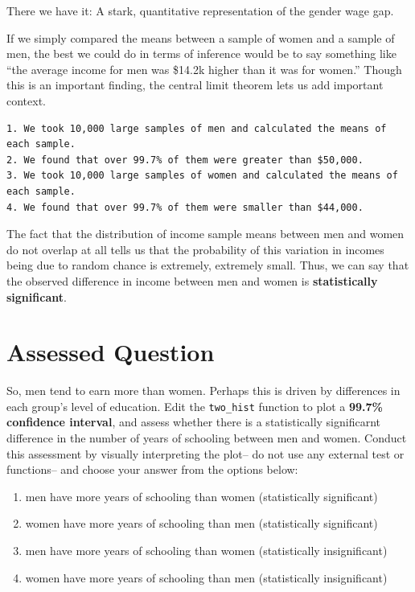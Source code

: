 \documentclass[
  letterpaper,
  DIV=11,
  numbers=noendperiod]{scrreprt}
\providecommand{\tightlist}{%
  \setlength{\itemsep}{0pt}\setlength{\parskip}{0pt}}\usepackage{longtable,booktabs,array}
\begin{document}
There we have it: A stark, quantitative representation of the gender
wage gap.

If we simply compared the means between a sample of women and a sample
of men, the best we could do in terms of inference would be to say
something like ``the average income for men was \$14.2k higher than it
was for women.'' Though this is an important finding, the central limit
theorem lets us add important context.

\begin{verbatim}
1. We took 10,000 large samples of men and calculated the means of each sample.
2. We found that over 99.7% of them were greater than $50,000. 
3. We took 10,000 large samples of women and calculated the means of each sample.
4. We found that over 99.7% of them were smaller than $44,000.
\end{verbatim}

The fact that the distribution of income sample means between men and
women do not overlap at all tells us that the probability of this
variation in incomes being due to random chance is extremely, extremely
small. Thus, we can say that the observed difference in income between
men and women is \textbf{statistically significant}.


\hypertarget{assessed-question-4}{%
\chapter{Assessed Question}\label{assessed-question-4}}

So, men tend to earn more than women. Perhaps this is driven by
differences in each group's level of education. Edit the
\texttt{two\_hist} function to plot a \textbf{99.7\% confidence
interval}, and assess whether there is a statistically significarnt
difference in the number of years of schooling between men and women.
Conduct this assessment by visually interpreting the plot-- do not use
any external test or functions-- and choose your answer from the options
below:

\begin{enumerate}
\def\labelenumi{\arabic{enumi}.}
\tightlist
\item
  men have more years of schooling than women (statistically
  significant)
\item
  women have more years of schooling than men (statistically
  significant)
\item
  men have more years of schooling than women (statistically
  insignificant)
\item
  women have more years of schooling than men (statistically
  insignificant)
\end{enumerate}
\end{document}
